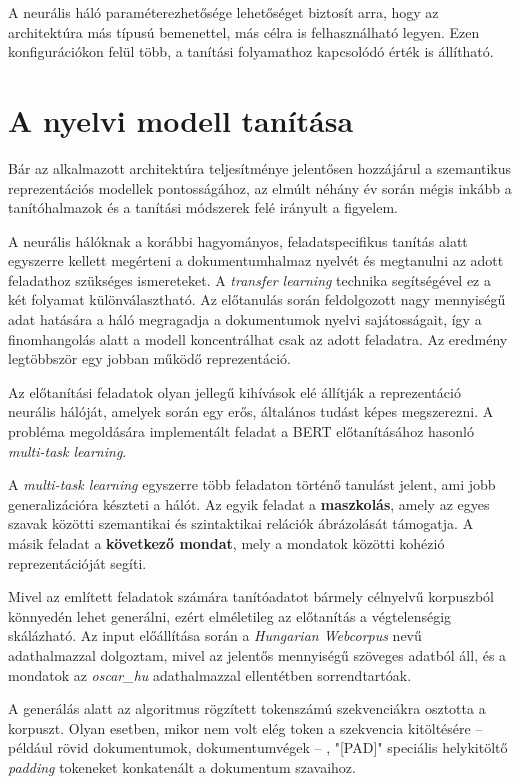 A neurális háló paraméterezhetősége lehetőséget biztosít arra, hogy az architektúra más típusú bemenettel, más célra is felhasználható legyen. Ezen konfigurációkon felül több, a tanítási folyamathoz kapcsolódó érték is állítható.

\section{A nyelvi modell tanítása}

Bár az alkalmazott architektúra teljesítménye jelentősen hozzájárul a szemantikus reprezentációs modellek pontosságához, az elmúlt néhány év során mégis inkább a tanítóhalmazok és a tanítási módszerek felé irányult a figyelem.

A neurális hálóknak a korábbi hagyományos, feladatspecifikus tanítás alatt egyszerre kellett megérteni a dokumentumhalmaz nyelvét és megtanulni az adott feladathoz szükséges ismereteket. A \textit{transfer learning} technika segítségével ez a két folyamat különválasztható. Az előtanulás során feldolgozott nagy mennyiségű adat hatására a háló megragadja a dokumentumok nyelvi sajátosságait, így a finomhangolás alatt a modell koncentrálhat csak az adott feladatra. Az eredmény legtöbbször egy jobban működő reprezentáció.

Az előtanítási feladatok olyan jellegű kihívások elé állítják a reprezentáció neurális hálóját, amelyek során egy erős, általános tudást képes megszerezni. A probléma megoldására implementált feladat a BERT előtanításához hasonló \textit{multi-task learning}. 

A \textit{multi-task learning} egyszerre több feladaton történő tanulást jelent, ami jobb generalizációra készteti a hálót. Az egyik feladat a \textbf{maszkolás}, amely az egyes szavak közötti szemantikai és szintaktikai relációk ábrázolását támogatja. A másik feladat a \textbf{következő mondat}, mely a mondatok közötti kohézió reprezentációját segíti.

Mivel az említett feladatok számára tanítóadatot bármely célnyelvű korpuszból könnyedén lehet generálni, ezért elméletileg az előtanítás a végtelenségig skálázható. Az input előállítása során a \textit{Hungarian Webcorpus} nevű adathalmazzal dolgoztam, mivel az jelentős mennyiségű szöveges adatból áll, és a mondatok az \textit{oscar\_hu} adathalmazzal ellentétben sorrendtartóak.

A generálás alatt az algoritmus rögzített tokenszámú szekvenciákra osztotta a korpuszt. Olyan esetben, mikor nem volt elég token a szekvencia kitöltésére – például rövid dokumentumok, dokumentumvégek – , "[PAD]" speciális helykitöltő \textit{padding} tokeneket konkatenált a dokumentum szavaihoz. 
 
